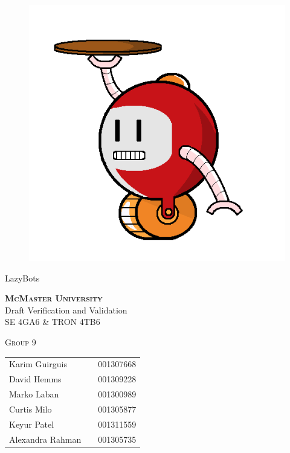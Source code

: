 \documentclass [10pt]{article}
\begin{document}
\begin {center} 

\thispagestyle{empty}
\vspace*{5cm}

\begin {figure}[h!]
\centering
\hspace{-10mm}\includegraphics [scale = .3, trim={.4cm 0 .8cm 0},clip] {figures/alfred.png}
\end {figure}

{
\Huge{LazyBots} }

\vspace{1 cm}
{\Large\textbf{\textsc{McMaster University}}\\}  \vspace {1cm}
{\Large Draft Verification and Validation\\ \vspace {0.4 cm} SE 4GA6 \& TRON 4TB6}  \vspace {1cm}

{\large \textsc{Group 9} \\} \vspace{1cm}

\begin{tabular}{ l c  l}
Karim Guirguis & & 001307668 \\
David Hemms & & 001309228 \\
Marko Laban & & 001300989 \\
Curtis Milo & & 001305877 \\
Keyur Patel & & 001311559 \\
Alexandra Rahman & & 001305735
\end{tabular}




\end{center}
\end{document}
